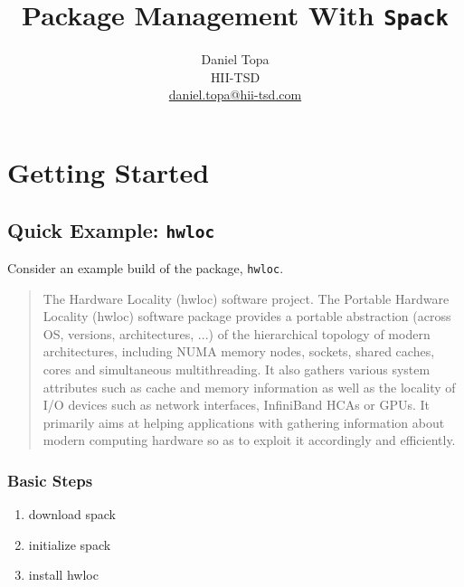 \documentclass[10pt, oneside]{article}   	%
\title{Package Management With \texttt{Spack}}
\author{Daniel Topa\\HII-TSD\\\href{mailto:daniel.topa@hii-tsd.com}{daniel.topa@hii-tsd.com}}
\begin{document}
\maketitle
{}

\section{Getting Started}

\subsection{Quick Example: \texttt{hwloc}}
Consider an example build of the package, \texttt{hwloc}.

\begin{quote}
The Hardware Locality (hwloc) software project. The Portable Hardware
Locality (hwloc) software package provides a portable abstraction
(across OS, versions, architectures, ...) of the hierarchical topology
of modern architectures, including NUMA memory nodes, sockets, shared
caches, cores and simultaneous multithreading. It also gathers various
system attributes such as cache and memory information as well as the
locality of I/O devices such as network interfaces, InfiniBand HCAs or
GPUs. It primarily aims at helping applications with gathering
information about modern computing hardware so as to exploit it
accordingly and efficiently.
\end{quote}

\subsubsection{Basic Steps}
\begin{enumerate}
	\item download spack
	\item initialize spack
	\item install hwloc
\end{enumerate}
\end{document}
